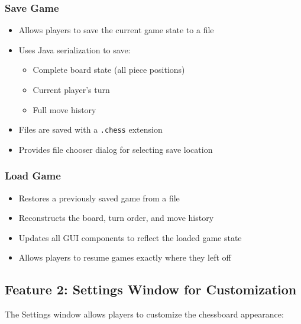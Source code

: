 \documentclass[12pt]{article}
\begin{document}
\subsubsection{Save Game}
\begin{itemize}
    \item Allows players to save the current game state to a file
    \item Uses Java serialization to save:
    \begin{itemize}
        \item Complete board state (all piece positions)
        \item Current player's turn
        \item Full move history
    \end{itemize}
    \item Files are saved with a \texttt{.chess} extension
    \item Provides file chooser dialog for selecting save location
\end{itemize}

\subsubsection{Load Game}
\begin{itemize}
    \item Restores a previously saved game from a file
    \item Reconstructs the board, turn order, and move history
    \item Updates all GUI components to reflect the loaded game state
    \item Allows players to resume games exactly where they left off
\end{itemize}

\subsection{Feature 2: Settings Window for Customization}

The Settings window allows players to customize the chessboard appearance:
\end{document}
